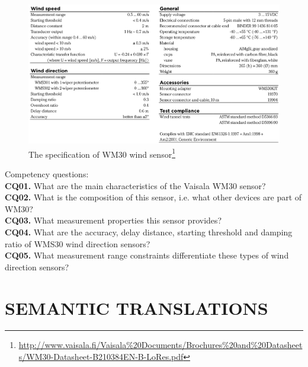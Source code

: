 \documentclass{sig-alternate-05-2015}
\begin{document}
\begin{figure}[h!]
\centering
\includegraphics[scale=0.22]{WM30specifications}
\caption{The specification of WM30 wind sensor\footnote{\url{http://www.vaisala.fi/Vaisala\%20Documents/Brochures\%20and\%20Datasheets/WM30-Datasheet-B210384EN-B-LoRes.pdf}}}
\label{fig:WM30specifications}
\end{figure}

Competency questions: 
\\\textbf{CQ01.} What are the main characteristics of the Vaisala WM30 sensor? 
\\\textbf{CQ02.} What is the composition of this sensor, i.e. what other devices are part of WM30?
\\\textbf{CQ03.} What measurement properties this sensor provides?
\\\textbf{CQ04.} What are the accuracy, delay distance, starting threshold and damping ratio of WMS30 wind direction sensors? 
\\\textbf{CQ05.} What measurement range constraints differentiate these types of wind direction sensors?




\section{SEMANTIC TRANSLATIONS}
\end{document}
